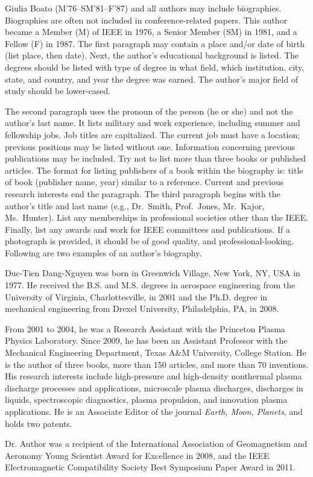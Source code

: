 \documentclass{ieeeaccess}
\begin{document}
\begin{IEEEbiography}{Giulia Boato} (M'76--SM'81--F'87) and all authors may include 
biographies. Biographies are often not included in conference-related
papers. This author became a Member (M) of IEEE in 1976, a Senior
Member (SM) in 1981, and a Fellow (F) in 1987. The first paragraph may
contain a place and/or date of birth (list place, then date). Next,
the author's educational background is listed. The degrees should be
listed with type of degree in what field, which institution, city,
state, and country, and year the degree was earned. The author's major
field of study should be lower-cased. 

The second paragraph uses the pronoun of the person (he or she) and not the 
author's last name. It lists military and work experience, including summer 
and fellowship jobs. Job titles are capitalized. The current job must have a 
location; previous positions may be listed 
without one. Information concerning previous publications may be included. 
Try not to list more than three books or published articles. The format for 
listing publishers of a book within the biography is: title of book 
(publisher name, year) similar to a reference. Current and previous research 
interests end the paragraph. The third paragraph begins with the author's 
title and last name (e.g., Dr.\ Smith, Prof.\ Jones, Mr.\ Kajor, Ms.\ Hunter). 
List any memberships in professional societies other than the IEEE. Finally, 
list any awards and work for IEEE committees and publications. If a 
photograph is provided, it should be of good quality, and 
professional-looking. Following are two examples of an author's biography.
\end{IEEEbiography}

\begin{IEEEbiography}{Duc-Tien Dang-Nguyen} was born in Greenwich Village, New York, NY, USA in 
1977. He received the B.S. and M.S. degrees in aerospace engineering from 
the University of Virginia, Charlottesville, in 2001 and the Ph.D. degree in 
mechanical engineering from Drexel University, Philadelphia, PA, in 2008.

From 2001 to 2004, he was a Research Assistant with the Princeton Plasma 
Physics Laboratory. Since 2009, he has been an Assistant Professor with the 
Mechanical Engineering Department, Texas A{\&}M University, College Station. 
He is the author of three books, more than 150 articles, and more than 70 
inventions. His research interests include high-pressure and high-density 
nonthermal plasma discharge processes and applications, microscale plasma 
discharges, discharges in liquids, spectroscopic diagnostics, plasma 
propulsion, and innovation plasma applications. He is an Associate Editor of 
the journal \emph{Earth, Moon, Planets}, and holds two patents. 

Dr. Author was a recipient of the International Association of Geomagnetism 
and Aeronomy Young Scientist Award for Excellence in 2008, and the IEEE 
Electromagnetic Compatibility Society Best Symposium Paper Award in 2011. 
\end{IEEEbiography}
\end{document}
